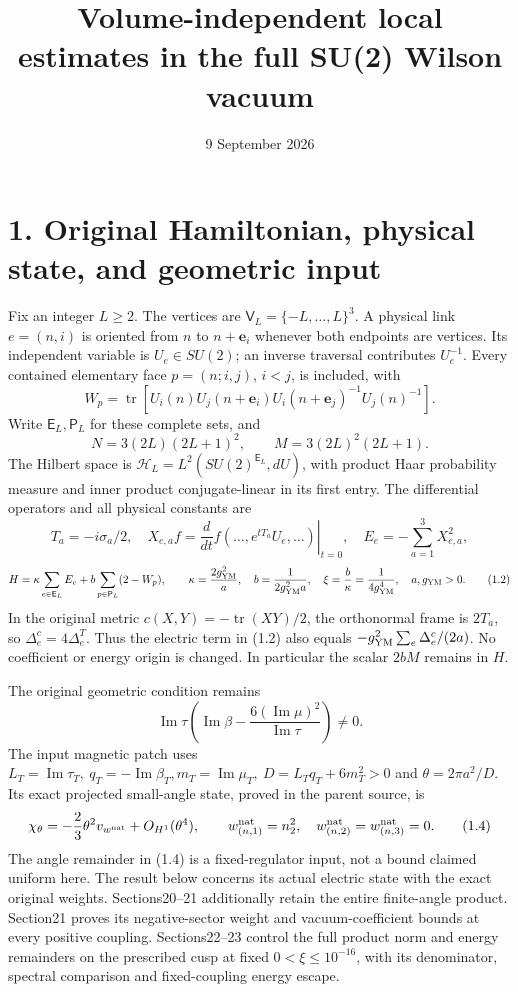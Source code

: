 \documentclass[
]{article}
\title{Volume-independent local estimates in the full SU(2) Wilson
vacuum}
\author{}
\date{9 September 2026}
\begin{document}
\maketitle

\section{1. Original Hamiltonian, physical state, and geometric
input}\label{original-hamiltonian-physical-state-and-geometric-input}

Fix an integer \(L\ge2\). The vertices are
\(\mathsf V_L=\{-L,\ldots,L\}^3\). A physical link \(e=(n,i)\) is
oriented from \(n\) to \(n+\mathbf e_i\) whenever both endpoints are
vertices. Its independent variable is \(U_e\in SU(2)\); an inverse
traversal contributes \(U_e^{-1}\). Every contained elementary face
\(p=(n;i,j)\), \(i<j\), is included, with \[
W_p=\operatorname{tr}\left[
 U_i(n)U_j(n+\mathbf e_i)U_i(n+\mathbf e_j)^{-1}U_j(n)^{-1}
\right].                                                    \tag{1.1}
\] Write \(\mathsf E_L,\mathsf P_L\) for these complete sets, and \[
N=3(2L)(2L+1)^2,\qquad M=3(2L)^2(2L+1).
\] The Hilbert space is \(\mathcal H_L=L^2(SU(2)^{\mathsf E_L},dU)\),
with product Haar probability measure and inner product conjugate-linear
in its first entry. The differential operators and all physical
constants are \[
T_a=-i\sigma_a/2,\quad
X_{e,a}f=\left.\frac{d}{dt}f(\ldots,e^{tT_a}U_e,\ldots)\right|_{t=0},
\quad E_e=-\sum_{a=1}^3X_{e,a}^2,
\] \[
H=\kappa\sum_{e\in\mathsf E_L}E_e
       +b\sum_{p\in\mathsf P_L}(2-W_p),\qquad
\kappa=\frac{2g_{\rm YM}^2}{a},\quad
b=\frac{1}{2g_{\rm YM}^2a},\quad
\xi=\frac b\kappa=\frac1{4g_{\rm YM}^4},\quad a,g_{\rm YM}>0.       \tag{1.2}
\] In the original metric \(c(X,Y)=-\operatorname{tr}(XY)/2\), the
orthonormal frame is \(2T_a\), so \(\Delta_e^c=4\Delta_e^T\). Thus the
electric term in (1.2) also equals
\(-g_{\rm YM}^2\sum_e\Delta_e^c/(2a)\). No coefficient or energy origin
is changed. In particular the scalar \(2bM\) remains in \(H\).

The original geometric condition remains \[
\operatorname{Im}\tau
\left(\operatorname{Im}\beta-
\frac{6(\operatorname{Im}\mu)^2}{\operatorname{Im}\tau}\right)\ne0.
                                                               \tag{1.3}
\] The input magnetic patch uses
\(L_T=\operatorname{Im}\tau_T,\ q_T=-\operatorname{Im}\beta_T,
m_T=\operatorname{Im}\mu_T,\ D=L_Tq_T+6m_T^2>0\) and
\(\theta=2\pi a^2/D\). Its exact projected small-angle state, proved in
the parent source, is \[
\chi_\theta=-\frac23\theta^2 v_{w^{\rm nat}}+O_{H^1}(\theta^4),
\qquad w^{\rm nat}_{(n,1)}=n_2^2,\quad
w^{\rm nat}_{(n,2)}=w^{\rm nat}_{(n,3)}=0.                         \tag{1.4}
\] The angle remainder in (1.4) is a fixed-regulator input, not a bound
claimed uniform here. The result below concerns its actual electric
state with the exact original weights. Sections20--21 additionally
retain the entire finite-angle product. Section21 proves its
negative-sector weight and vacuum-coefficient bounds at every positive
coupling. Sections22--23 control the full product norm and energy
remainders on the prescribed cusp at fixed \(0<\xi\le10^{-16}\), with
its denominator, spectral comparison and fixed-coupling energy escape.
\end{document}
